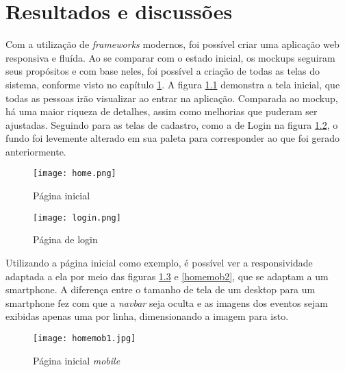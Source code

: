 \chapter{Resultados e discussões}\label{chp:LABEL_CHP_5}
\label{resultados}
Com a utilização de \textit{frameworks} modernos, foi possível criar uma aplicação web responsiva e fluída. Ao se comparar com o estado inicial, os mockups seguiram seus propósitos e com base neles, foi possível a criação de todas as telas do sistema, conforme visto no capítulo \ref{chp:LABEL_CHP_5}. A figura \ref{home} demonstra a tela inicial, que todas as pessoas irão visualizar ao entrar na aplicação. Comparada ao mockup, há uma maior riqueza de detalhes, assim como melhorias que puderam ser ajustadas. Seguindo para as telas de cadastro, como a de Login na figura \ref{login}, o fundo foi levemente alterado em sua paleta para corresponder ao que foi gerado anteriormente. 

\begin{figure}[H]
    \caption{\label{home}Página inicial}
    \vspace{5pt}
    \centering
    \texttt{[image: home.png]}
    \vspace{5pt}
\end{figure}
\begin{figure}[H]
    \caption{\label{login}Página de login}
    \vspace{5pt}
    \centering
    \texttt{[image: login.png]}
    \vspace{5pt}
\end{figure}

Utilizando a página inicial como exemplo, é possível ver a responsividade adaptada a ela por meio das figuras \ref{homemob1} e \ref{homemob2}, que se adaptam a um smartphone. A diferença entre o tamanho de tela de um desktop para um smartphone fez com que a \textit{navbar} seja oculta e as imagens dos eventos sejam exibidas apenas uma por linha, dimensionando a imagem para isto.

\begin{figure}[H]
    \caption{\label{homemob1}Página inicial \textit{mobile}}
    \vspace{5pt}
    \centering
    \texttt{[image: homemob1.jpg]}
    \vspace{5pt}
\end{figure}

